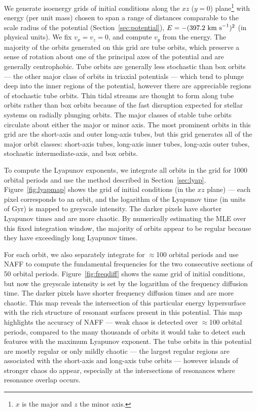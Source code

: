 \documentclass[letterpaper,12pt,preprint]{aastex}
\begin{document}
We generate isoenergy grids of initial conditions along the $xz$ ($y=0$) plane\footnote{$x$ is the major and $z$ the minor axis.} with energy (per unit mass) chosen to span a range of distances comparable to the scale radius of the potential (Section~\ref{sec:potential}), $E=-(397.2~{\rm km~s}^{-1})^2$ (in physical units). We fix $v_x = v_z = 0$, and compute $v_y$ from the energy. The majority of the orbits generated on this grid are tube orbits, which preserve a sense of rotation about one of the principal axes of the potential and are generally centrophobic. Tube orbits are generally less stochastic than box orbits --- the other major class of orbits in triaxial potentials --- which tend to plunge deep into the inner regions of the potential, however there are appreciable regions of stochastic tube orbits. Thin tidal streams are thought to form along tube orbits rather than box orbits because of the fast disruption expected for stellar systems on radially plunging orbits. The major classes of stable tube orbits circulate about either the major or minor axis. The most prominent orbits in this grid are the short-axis and outer long-axis tubes, but this grid generates all of the major orbit classes: short-axis tubes, long-axis inner tubes, long-axis outer tubes, stochastic intermediate-axis, and box orbits. 

To compute the Lyapunov exponents, we integrate all orbits in the grid for 1000 orbital periods and use the method described in Section~\ref{sec:lyap}. Figure~\ref{fig:lyapmap} shows the grid of initial conditions (in the $xz$ plane) --- each pixel corresponds to an orbit, and the logarithm of the Lyapunov time (in units of Gyr) is mapped to greyscale intensity. The darker pixels have shorter Lyapunov times and are more chaotic. By numerically estimating the MLE over this fixed integration window, the majority of orbits appear to be regular because they have exceedingly long Lyapunov times. 

For each orbit, we also separately integrate for $\approx$100 orbital periods and use NAFF to compute the fundamental frequencies for the two consecutive sections of 50 orbital periods. Figure~\ref{fig:freqdiff} shows the same grid of initial conditions, but now the greyscale intensity is set by the logarithm of the frequency diffusion time. The darker pixels have shorter frequency diffusion times and are more chaotic. This map reveals the intersection of this particular energy hypersurface with the rich structure of resonant surfaces present in this potential. This map highlights the accuracy of NAFF --- weak chaos is detected over $\approx$100 orbital periods, compared to the many thousands of orbits it would take to detect such features with the maximum Lyapunov exponent. The tube orbits in this potential are mostly regular or only mildly chaotic --- the largest regular regions are associated with the short-axis and long-axis tube orbits --- however islands of stronger chaos do appear, especially at the intersections of resonances where resonance overlap occurs. 
\end{document}

